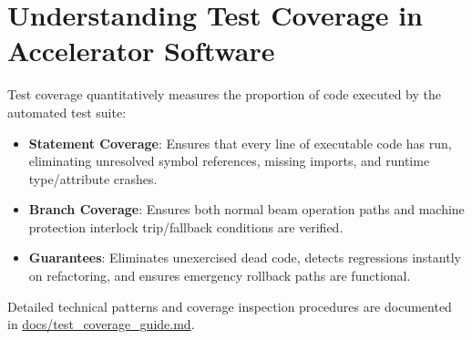 \documentclass[11pt,a4paper]{report}
\begin{document}
\section{Understanding Test Coverage in Accelerator Software}
Test coverage quantitatively measures the proportion of code executed by the automated test suite:
\begin{itemize}
    \item \textbf{Statement Coverage}: Ensures that every line of executable code has run, eliminating unresolved symbol references, missing imports, and runtime type/attribute crashes.
    \item \textbf{Branch Coverage}: Ensures both normal beam operation paths and machine protection interlock trip/fallback conditions are verified.
    \item \textbf{Guarantees}: Eliminates unexercised dead code, detects regressions instantly on refactoring, and ensures emergency rollback paths are functional.
\end{itemize}
Detailed technical patterns and coverage inspection procedures are documented in \url{docs/test_coverage_guide.md}.
\end{document}
